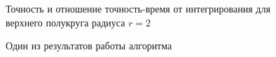 \documentclass[a4paper, 12pt]{article}
\begin{document}
    \begin{figure}[h!]
      \noindent{}
      \caption{Точность и отношение точность-время от интегрирования для верхнего полукруга радиуса $r=2$}
      \label{hcirc2}
      \end{figure} 

      \begin{figure}[h] 
        \vfill 
        \caption{Один из результатов работы алгоритма} 
        \label{hexampl2} 
        \end{figure}     
        
\end{document}
